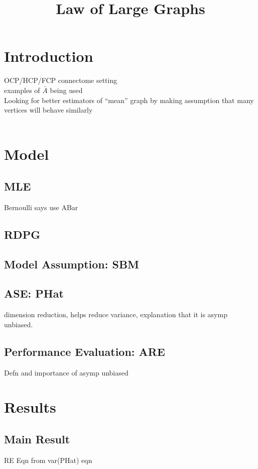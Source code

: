 \documentclass[10pt]{article}
\title{Law of Large Graphs}
\author{}
\date{}
\begin{document}
	\large
	\maketitle
	\thispagestyle{headings}
	
	\vspace{-.5in}
	\section{Introduction}
	OCP/HCP/FCP connectome setting\\
	examples of $\bar{A}$ being used\\
	Looking for better estimators of “mean” graph by making assumption that many vertices will behave similarly\\
	\cite{Athreya2013}
	\cite{Cerqueira2015}
	\cite{Fishkind2012}
	\cite{Freer2014}\\
	\cite{Oliveira2009}
	
	\section{Model}
	\subsection{MLE}
		Bernoulli says use ABar
	\subsection{RDPG}
	\subsection{Model Assumption: SBM}
	\subsection{ASE: PHat}
	dimension reduction, helps reduce variance, explanation that it is asymp unbiased.
	\subsection{Performance Evaluation: ARE}
	Defn and importance of asymp unbiased\\
		\cite{Lyzinski2000}
		\cite{Scheinerman2010}
	\section{Results}
	\subsection{Main Result}
		RE Eqn from var(PHat) eqn\\
\end{document}
